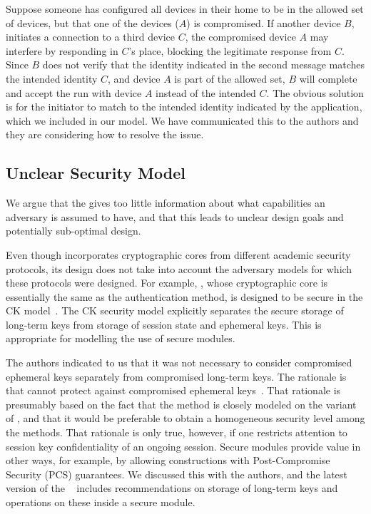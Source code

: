\documentclass[runningheads]{llncs}
\begin{document}
Suppose someone has configured all devices in their home to be in the
allowed set of devices, but that one of the devices ($A$) is compromised.
%
If another device $B$, initiates a connection to a third device $C$, the
compromised device $A$ may interfere by responding in $C$'s place, blocking
the legitimate response from $C$.
%
Since $B$ does not verify that the identity indicated in the second message
matches the intended identity $C$, and device $A$ is part of the allowed set,
$B$ will complete and accept the \mEdhoc{} run with device $A$ instead of the
intended $C$.
%
The obvious solution is for the initiator to match \mIdcredr{} to the intended
identity indicated by the application, which we included in our model.
%
We have communicated this to the \mEdhoc{} authors and they are considering
how to resolve the issue.
%

\subsection{Unclear Security Model}
We argue that the \mSpec{} gives too little information about what capabilities
an adversary is assumed to have, and that this leads to unclear design goals and
potentially sub-optimal design.
%

Even though \mEdhoc{} incorporates cryptographic cores from different academic
security protocols, its design does not take into account the adversary models
for which these protocols were designed.
%
For example, \mOptls{}, whose cryptographic core is essentially the same
as the \mStat{} authentication method, is designed to be secure in the CK
model~\cite{DBLP:conf/crypto/CanettiK02}.
%
The CK security model explicitly separates the secure storage of long-term
keys from storage of session state and ephemeral keys.
%
This is appropriate for modelling the use of secure modules.
%

The \mEdhoc{} authors indicated to us that it was
not necessary to consider compromised ephemeral keys separately from
compromised long-term keys.
%
The rationale is that \mSigma{} cannot protect against compromised ephemeral
keys~\cite{personalCommunication}.
%
That rationale is presumably based on the fact that the \mSigSig{} method is
closely modeled on the \mSigmaI{} variant of \mSigma{}, and that it would be
preferable to obtain a homogeneous security level among the \mEdhoc{}
methods.
%
That rationale is only true, however, if one restricts attention to session key
confidentiality of an ongoing session.
%
Secure modules provide value in other ways, for example, by allowing
constructions with Post-Compromise Security (PCS) guarantees.
%
We discussed this with the authors, and
the latest version of the \mSpec{}~\cite{latest-ietf-lake-edhoc-05} includes
recommendations on storage of long-term keys and operations on these inside a
secure module.
%
\end{document}
